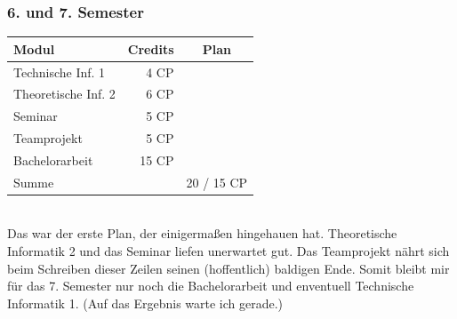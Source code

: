 \begin{multicols}{2}
\subsubsection*{6. und 7. Semester}
{
\footnotesize
\begin{tabular}{|l|r|c|}
\hline \textbf{Modul}		& \textbf{Credits} 	& \textbf{Plan} \\ 
\hline
\hline Technische Inf. 1 	& 4 CP 				& \nx 			\\ 
\hline Theoretische Inf. 2 	& 6 CP 				& \nx 			\\ 
\hline Seminar				& 5 CP 				& \nx 			\\ 
\hline Teamprojekt 			& 5 CP 				& \nx 			\\ 
\hline 
\hline Bachelorarbeit 		& 15 CP 			& \nx 			\\ 
\hline 
\hline Summe 				&  					& 20 / 15 CP 		\\ 
\hline 
\end{tabular}
}\\
Das war der erste Plan, der einigermaßen hingehauen hat. Theoretische
Informatik 2 und das Seminar liefen unerwartet gut. Das Teamprojekt
nährt sich beim Schreiben dieser Zeilen seinen (hoffentlich) baldigen
Ende. Somit bleibt mir für das 7. Semester nur noch die Bachelorarbeit
und enventuell Technische Informatik 1. (Auf das Ergebnis warte ich gerade.)


\end{multicols}
